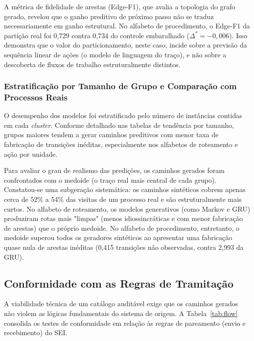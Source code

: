 A métrica de fidelidade de arestas (Edge-F1), que avalia a topologia do grafo gerado, revelou que o ganho preditivo de próximo passo não se traduz necessariamente em ganho estrutural. No alfabeto de procedimento, o Edge-F1 da partição real foi 0,729 contra 0,734 do controle embaralhado ($\Delta^* = -0{,}006$). Isso demonstra que o valor do particionamento, neste caso, incide sobre a previsão da sequência linear de ações (o modelo de linguagem do traço), e não sobre a descoberta de fluxos de trabalho estruturalmente distintos.

\subsubsection{Estratificação por Tamanho de Grupo e Comparação com Processos Reais}\label{sec:res-tamanho}

O desempenho dos modelos foi estratificado pelo número de instâncias contidas em cada \emph{cluster}. Conforme detalhado nas tabelas de tendência por tamanho, grupos maiores tendem a gerar caminhos preditivos com menor taxa de fabricação de transições inéditas, especialmente nos alfabetos de roteamento e ação por unidade. 



Para avaliar o grau de realismo das predições, os caminhos gerados foram confrontados com o medoide (o traço real mais central de cada grupo). Constatou-se uma subgeração sistemática: os caminhos sintéticos cobrem apenas cerca de 52\% a 54\% das visitas de um processo real e são estruturalmente mais curtos. No alfabeto de roteamento, os modelos generativos (como Markov e GRU) produziram rotas mais "limpas" (menos idiossincráticas e com menor fabricação de arestas) que o próprio medoide. No alfabeto de procedimento, entretanto, o medoide superou todos os geradores sintéticos ao apresentar uma fabricação quase nula de arestas inéditas (0,415 transições não observadas, contra 2,993 da GRU).

\subsection{Conformidade com as Regras de Tramitação}\label{sec:res-conformidade}

A viabilidade técnica de um catálogo auditável exige que os caminhos gerados não violem as lógicas fundamentais do sistema de origem. A Tabela~\ref{tab:flow} consolida os testes de conformidade em relação às regras de pareamento (envio e recebimento) do SEI.

